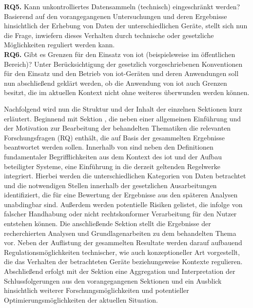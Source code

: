 \textbf{RQ5.} Kann unkontrolliertes Datensammeln (technisch) eingeschränkt werden? Basierend auf den vorangegangenen Untersuchungen und deren Ergebnisse hinsichtlich der Erhebung von Daten der unterschiedlichen Geräte, stellt sich nun die Frage, inwiefern dieses Verhalten durch technische oder gesetzliche Möglichkeiten reguliert werden kann.\\
\textbf{RQ6.} Gibt es Grenzen für den Einsatz von \ac{iot} (beispielsweise im öffentlichen Bereich)? Unter Berücksichtigung der gesetzlich vorgeschriebenen Konventionen für den Einsatz und den Betrieb von \ac{iot}-Geräten und deren Anwendungen soll nun abschließend geklärt werden, ob die Anwendung von \ac{iot} auch Grenzen besitzt, die im aktuellen Kontext nicht ohne weiteres überwunden werden können.


Nachfolgend wird nun die Struktur und der Inhalt der einzelnen Sektionen kurz erläutert. Beginnend mit Sektion , die neben einer allgemeinen Einführung und der Motivation zur Bearbeitung der behandelten Thematiken die relevanten Forschungsfragen (RQ) enthält, die auf Basis der gesammelten Ergebnisse beantwortet werden sollen. Innerhalb von  sind neben den Definitionen fundamentaler Begrifflichkeiten aus dem Kontext des \ac{iot} und der Aufbau beteiligter Systeme, eine Einführung in die derzeit geltenden Regelwerke integriert. Hierbei werden die unterschiedlichen Kategorien von Daten betrachtet und die notwendigen Stellen innerhalb der gesetzlichen Ausarbeitungen identifiziert, die für eine Bewertung der Ergebnisse aus den späteren Analysen unabdingbar sind. Außerdem werden potentielle Risiken gelistet, die infolge von falscher Handhabung oder nicht rechtskonformer Verarbeitung für den Nutzer entstehen können. Die anschließende Sektion  stellt die Ergebnisse der recherchierten Analysen und Grundlagenarbeiten zu dem behandelten Thema vor. Neben der Auflistung der gesammelten Resultate werden darauf aufbauend Regulationsmöglichkeiten technischer, wie auch konzeptioneller Art vorgestellt, die das Verhalten der betrachteten Geräte beziehungsweise Kontexte regulieren. Abschließend erfolgt mit der Sektion  eine Aggregation und Interpretation der Schlussfolgerungen aus den vorangegangenen Sektionen und ein Ausblick hinsichtlich weiterer Forschungsmöglichkeiten und potentieller Optimierungsmöglichkeiten der aktuellen Situation.


